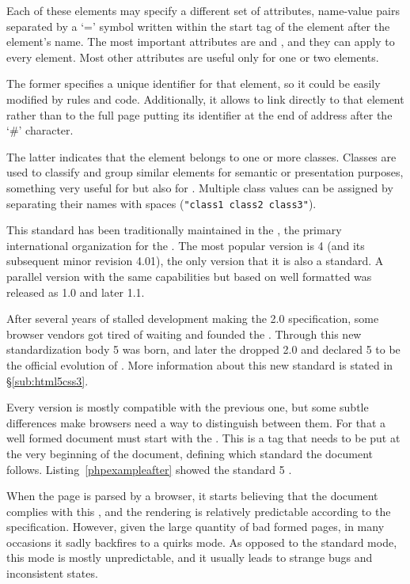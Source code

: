 Each of these elements may specify a different set of attributes, name-value pairs separated by a `=' symbol written within the start tag of the element after the element's name.
The most important attributes are  and , and they can apply to every element.
Most other attributes are useful only for one or two elements.

The former specifies a unique identifier for that element, so it could be easily modified by  rules and  code.
Additionally, it allows to link directly to that element rather than to the full page putting its identifier at the end of address after the `\#' character.

The latter indicates that the element belongs to one or more classes.
Classes are used to classify and group similar elements for semantic or presentation purposes, something very useful for  but also for .
Multiple class values can be assigned by separating their names with spaces (\texttt{"class1 class2 class3"}).

This standard has been traditionally maintained in the , the primary international organization for the .
The most popular version is  4 (and its subsequent minor revision  4.01), the only version that it is also a  standard.
A parallel version with the same capabilities but based on well formatted  was released as  1.0 and later  1.1.

After several years of stalled development making the  2.0 specification, some browser vendors got tired of waiting and founded the .
Through this new standardization body  5 was born, and later the  dropped  2.0 and declared  5 to be the official evolution of .
More information about this new standard is stated in \S\ref{sub:html5css3}.

Every version is mostly compatible with the previous one, but some subtle differences make browsers need a way to distinguish between them.
For that a well formed  document must start with the .
This is a tag that needs to be put at the very beginning of the document, defining which standard the document follows.
Listing~\vref{phpexampleafter} showed the standard  5 .

When the page is parsed by a browser, it starts believing that the document complies with this , and the rendering is relatively predictable according to the specification.
However, given the large quantity of bad formed pages, in many occasions it sadly backfires to a quirks mode.
As opposed to the standard mode, this mode is mostly unpredictable, and it usually leads to strange bugs and inconsistent states.

